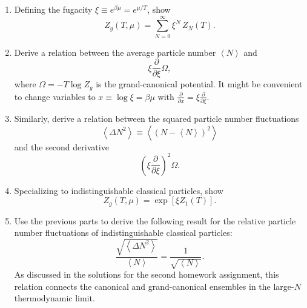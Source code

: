 \documentclass[12 pt]{article} %
\newcommand{\be}{\ensuremath{\beta} }
\newcommand{\De}{\ensuremath{\Delta} }
\newcommand{\Om}{\ensuremath{\Omega} }
\newcommand{\vev}[1]{\ensuremath{\left\langle #1 \right\rangle} }
\newcommand{\pderiv}[2]{\ensuremath{\frac{\partial #1}{\partial #2}} }
\begin{document}
\begin{enumerate}[label={(\alph*)}]
  \item Defining the fugacity $\xi \equiv e^{\be \mu} = e^{\mu / T}$, show
        \begin{equation*}
          Z_g(T, \mu) = \sum_{N = 0}^{\infty} \xi^N \, Z_N(T).
        \end{equation*}

  \item Derive a relation between the average particle number $\vev{N}$ and
        \begin{equation*}
          \xi \pderiv{}{\xi} \Om,
        \end{equation*}
        where $\Om = -T \log Z_g$ is the grand-canonical potential.
        It might be convenient to change variables to $x \equiv \log \xi = \be \mu$ with $\displaystyle \pderiv{}{x} = \xi\pderiv{}{\xi}$.

  \item Similarly, derive a relation between the squared particle number fluctuations
        \begin{equation*}
          \vev{\De N^2} \equiv \vev{\left(N - \vev{N}\right)^2}
        \end{equation*}
        and the second derivative
        \begin{equation*}
          \left(\xi \pderiv{}{\xi}\right)^2 \Om.
        \end{equation*}

  \item Specializing to indistinguishable classical particles, show
        \begin{equation*}
          Z_g(T, \mu) = \exp\left[\xi Z_1(T)\right].
        \end{equation*}

  \item Use the previous parts to derive the following result for the relative particle number fluctuations of indistinguishable classical particles:
        \begin{equation*}
          \frac{\sqrt{\vev{\De N^2}}}{\vev{N}} = \frac{1}{\sqrt{\vev{N}}}.
        \end{equation*}
        As discussed in the solutions for the second homework assignment, this relation connects the canonical and grand-canonical ensembles in the large-$N$ thermodynamic limit.
\end{enumerate}
\end{document}
